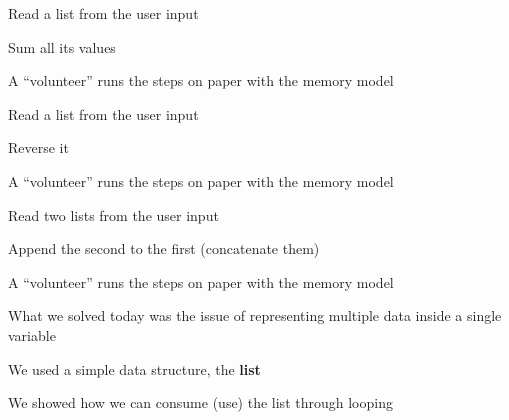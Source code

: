 \documentclass{beamer}
\begin{document}
\begin{slide}{
\item Read a list from the user input
\item Sum all its values
\item A ``volunteer'' runs the steps on paper with the memory model
}\end{slide}

\begin{slide}{
\item Read a list from the user input
\item Reverse it
\item A ``volunteer'' runs the steps on paper with the memory model
}\end{slide}

\begin{slide}{
\item Read two lists from the user input
\item Append the second to the first (concatenate them)
\item A ``volunteer'' runs the steps on paper with the memory model
}\end{slide}

\begin{slide}{
\item What we solved today was the issue of representing multiple data inside a single variable
\item We used a simple data structure, the \textbf{list}
\item We showed how we can consume (use) the list through looping
}\end{slide}

\begin{thankyou}{
}\end{thankyou}
\end{document}
